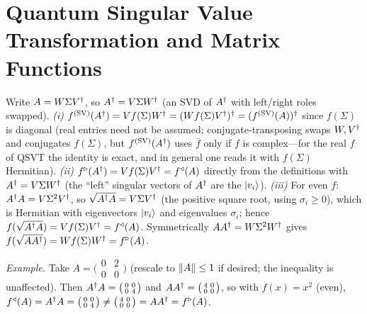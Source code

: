 \chapter{Quantum Singular Value Transformation and Matrix Functions}

\begin{solution}
Write $A=W\Sigma V^{\dagger}$, so $A^{\dagger}=V\Sigma W^{\dagger}$ (an SVD of $A^{\dagger}$ with left/right roles
swapped).
\emph{(i)} $f^{(\mathrm{SV})}(A^{\dagger})=V f(\Sigma) W^{\dagger}=(Wf(\Sigma)V^{\dagger})^{\dagger}
=(f^{(\mathrm{SV})}(A))^{\dagger}$ since $f(\Sigma)$ is diagonal (real entries need not be
assumed; conjugate-transposing swaps $W,V^{\dagger}$ and conjugates $f(\Sigma)$, but
$f^{(\mathrm{SV})}(A^{\dagger})$ uses $\bar f$ only if $f$ is complex---for the real $f$ of
QSVT the identity is exact, and in general one reads it with $f(\Sigma)$ Hermitian).
\emph{(ii)} $f^{\triangleright}(A^{\dagger})=V f(\Sigma)V^{\dagger}=f^{\triangleleft}(A)$ directly
from the definitions with $A^{\dagger}=V\Sigma W^{\dagger}$ (the ``left'' singular vectors of $A^{\dagger}$
are the $\ket{v_i}$).
\emph{(iii)} For even $f$: $A^{\dagger} A=V\Sigma^2 V^{\dagger}$, so $\sqrt{A^{\dagger} A}=V\Sigma V^{\dagger}$
(the positive square root, using $\sigma_i\ge0$), which is Hermitian with eigenvectors
$\ket{v_i}$ and eigenvalues $\sigma_i$; hence $f(\sqrt{A^{\dagger} A})=Vf(\Sigma)V^{\dagger}
=f^{\triangleleft}(A)$. Symmetrically $AA^{\dagger}=W\Sigma^2 W^{\dagger}$ gives
$f(\sqrt{AA^{\dagger}})=Wf(\Sigma)W^{\dagger}=f^{\triangleright}(A)$.

\emph{Example.} Take $A=\bigl(\begin{smallmatrix}0&2\\0&0\end{smallmatrix}\bigr)$
(rescale to $\left\lVert A \right\rVert\le1$ if desired; the inequality is unaffected). Then
$A^{\dagger} A=\bigl(\begin{smallmatrix}0&0\\0&4\end{smallmatrix}\bigr)$ and
$AA^{\dagger}=\bigl(\begin{smallmatrix}4&0\\0&0\end{smallmatrix}\bigr)$, so with $f(x)=x^2$
(even), $f^{\triangleleft}(A)=A^{\dagger} A=\bigl(\begin{smallmatrix}0&0\\0&4\end{smallmatrix}
\bigr)\neq\bigl(\begin{smallmatrix}4&0\\0&0\end{smallmatrix}\bigr)=AA^{\dagger}
=f^{\triangleright}(A)$.
\end{solution}

